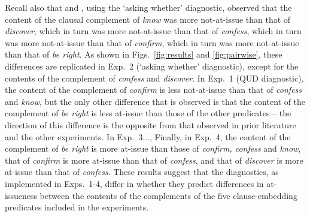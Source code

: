\documentclass[times,linguex,xcolor]{glossa}
\begin{document}
  Recall also that \citealt{tonhauser_how_2018} and \citealt{degen-tonhauser-glossa}, using the `asking whether' diagnostic, observed that the content of the clausal complement of \emph{know} was more not-at-issue than that of \emph{discover}, which in turn was more not-at-issue than that of \emph{confess}, which in turn was more not-at-issue than that of \emph{confirm}, which in turn was more not-at-issue than that of \emph{be right}.  As shown in Figs.~\ref{fig:results} and \ref{fig:pairwise}, these differences are replicated in Exp.~2 (`asking whether' diagnostic), except for the contents of the complement of \emph{confess} and \emph{discover}. In Exp.~1 (QUD diagnostic), the content of the complement of \emph{confirm} is less not-at-issue than that of \emph{confess} and \emph{know}, but the only other difference that is observed is that the content of the complement of \emph{be right} is less at-issue than those of the other predicates -- the direction of this difference is the opposite from that observed in prior literature and the other experiments. In Exp.~3..., Finally, in Exp.~4, the content of the complement of \emph{be right} is more at-issue than those of \emph{confirm, confess} and \emph{know}, that of \emph{confirm} is more at-issue than that of \emph{confess}, and that of \emph{discover} is more at-issue than that of \emph{confess}. These results suggest that the diagnostics, as implemented in Exps.~1-4, differ in whether they predict differences in at-issueness between the contents of the complements of the five clause-embedding predicates included in the experiments.
   



 
  \addtolength{\tabcolsep}{-.19em}
\end{document}
